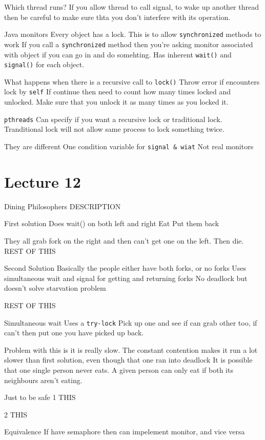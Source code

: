 \documentclass{article}
\begin{document}
	Which thread runs?
		If you allow thread to call signal, to wake up another thread then be careful to make sure thta you don't interfere with its operation.

	Java monitors
		Every object has a lock. This is to allow \texttt{synchronized} methods to work
		If you call a \texttt{synchronized} method then you're asking monitor associated with object if you can go in and do somehting.
		Has inherent \texttt{wait()} and \texttt{signal()} for each object.

		What happens when there is a recursive call to \texttt{lock()}
			Throw error if encounters lock by \texttt{self}
			If continue then need to count how many times locked and unlocked. Make sure that you unlock it as many times as you locked it.

		\texttt{pthreads} Can specify if you want a recursive lock or traditional lock. Tranditional lock will not allow same process to lock something twice.

		They are different
			One condition variable for \texttt{signal \& wiat}
			Not real monitors

\section{Lecture 12}
	Dining Philosophers
		DESCRIPTION

	First solution
		Does wait() on both left and right
		Eat
		Put them back

		They all grab fork on the right and then can't get one on the left. Then die.
		REST OF THIS

	Second Solution
		Basically the people either have both forks, or no forks
		Uses simultaneous wait and signal for getting and returning forks
		No deadlock but doesn't solve starvation problem

		REST OF THIS

		Simultaneous wait
			Uses a \texttt{try-lock}
			Pick up one and see if can grab other too, if can't then put one you have picked up back.


		Problem with this is it is really slow. The constant contention makes it run a lot slower than first solution, even though that one ran into deadlock
		It is possible that one single person never eats. 
		A given person can only eat if both its neighbours aren't eating.

	Just to be safe
		1
			THIS

		2
			THIS


	Equivalence
		If have semaphore then can impelement monitor, and vice versa
\end{document}
